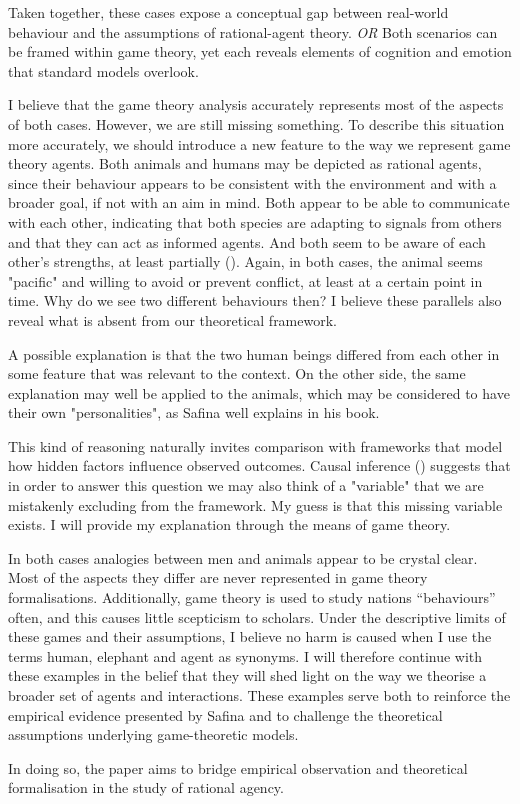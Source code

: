 Taken together, these cases expose a conceptual gap between real-world behaviour and the assumptions of rational-agent theory. \textit{\color{red}OR } Both scenarios can be framed within game theory, yet each reveals elements of cognition and emotion that standard models overlook.

\vspace{1em}
I believe that the game theory analysis accurately represents most of the aspects of both cases. However, we are still missing something. To describe this situation more accurately, we should introduce a new feature to the way we represent game theory agents. Both animals and humans may be depicted as rational agents, since their behaviour appears to be consistent with the environment and with a broader goal, if not with an aim in mind. Both appear to be able to communicate with each other, indicating that both species are adapting to signals from others and that they can act as informed agents. And both seem to be aware of each other's strengths, at least partially (\cite{schelling_strategy_1960, smith_logic_1973}). Again, in both cases, the animal seems "pacific" and willing to avoid or prevent conflict, at least at a certain point in time.
Why do we see two different behaviours then? I believe these parallels also reveal what is absent from our theoretical framework.

\vspace{1em}
A possible explanation is that the two human beings differed from each other in some feature that was relevant to the context. On the other side, the same explanation may well be applied to the animals, which may be considered to have their own "personalities", as Safina well explains in his book.

\vspace{1em}
This kind of reasoning naturally invites comparison with frameworks that model how hidden factors influence observed outcomes.
Causal inference (\cite{pearl_causality_2009}) suggests that in order to answer this question we may also think of a "variable" that we are mistakenly excluding from the framework. My guess is that this missing variable exists. I will provide my explanation through the means of game theory.

\vspace{1em}
In both cases analogies between men and animals appear to be crystal clear. Most of the aspects they differ are never represented in game theory formalisations. Additionally, game theory is used to study nations “behaviours” often, and this causes little scepticism to scholars. Under the descriptive limits of these games and their assumptions, I believe no harm is caused when I use the terms human, elephant and agent as synonyms.
I will therefore continue with these examples in the belief that they will shed light on the way we theorise a broader set of agents and interactions. These examples serve both to reinforce the empirical evidence presented by Safina and to challenge the theoretical assumptions underlying game-theoretic models.

\vspace{1em}
In doing so, the paper aims to bridge empirical observation and theoretical formalisation in the study of rational agency.